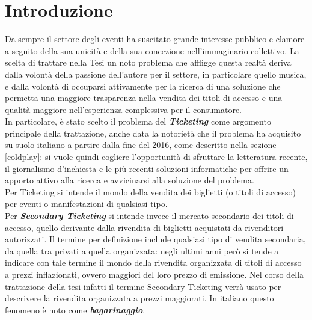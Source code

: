 \chapter{Introduzione}
\label{chap:intro}
Da sempre il settore degli eventi ha suscitato grande interesse pubblico e clamore a seguito della sua unicità e della sua concezione nell'immaginario collettivo. La scelta di trattare nella Tesi un noto problema che affligge questa realtà deriva dalla volontà della passione dell'autore per il settore, in particolare quello musica, e dalla volontà di occuparsi attivamente per la ricerca di una soluzione che permetta una maggiore trasparenza nella vendita dei titoli di accesso e una qualità maggiore nell'esperienza complessiva per il consumatore. \\
In particolare, è stato scelto il problema del \textbf{\emph{Ticketing}} come argomento principale della trattazione, anche data la notorietà che il problema ha acquisito su suolo italiano a partire dalla fine del 2016, come descritto nella sezione \ref{coldplay}: si vuole quindi cogliere l'opportunità di sfruttare la letteratura recente, il giornalismo d'inchiesta e le più recenti soluzioni informatiche per offrire un apporto attivo alla ricerca e avvicinarsi alla soluzione del problema. \\
Per Ticketing si intende il mondo della vendita dei biglietti (o titoli di accesso) per eventi o manifestazioni di qualsiasi tipo. \\
Per \textbf{\textit{Secondary Ticketing}} si intende invece il mercato secondario dei titoli di accesso, quello derivante dalla rivendita di biglietti acquistati da rivenditori autorizzati. Il termine per definizione include qualsiasi tipo di vendita secondaria, da quella tra privati a quella organizzata: negli ultimi anni però si tende a indicare con tale termine il mondo della rivendita organizzata di titoli di accesso a prezzi inflazionati, ovvero maggiori del loro prezzo di emissione. Nel corso della trattazione della tesi infatti il termine Secondary Ticketing verrà usato per descrivere la rivendita organizzata a prezzi maggiorati. In italiano questo fenomeno è noto come \textbf{\textit{bagarinaggio}}. 

